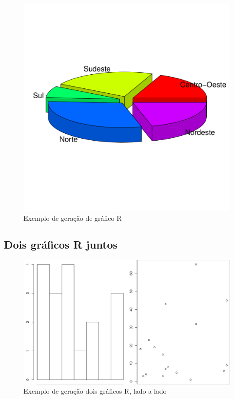 \documentclass[
	12pt,				%
	oneside,			%
	a4paper,			%
	english,			%
	french,				%
	spanish,			%
	brazil				%
	]{abntex2}
\begin{document}
\begin{figure}[htbp]
\hypertarget{pizza}{%
\caption{Exemplo de geração de gráfico R}\label{pizza}
\begin{center}
\includegraphics[scale=0.4]{imagens/R/pizza-grafico.pdf}
\end{center}
}
\end{figure}

\hypertarget{dois-gruxe1ficos-r-juntos}{%
\subsection{Dois gráficos R juntos}\label{dois-gruxe1ficos-r-juntos}}

\begin{figure}[htbp]
\hypertarget{doisgraficos}{%
\caption{Exemplo de geração dois gráficos R, lado a lado}\label{doisgraficos}
\begin{center}
\includegraphics[scale=0.4]{imagens/R/dois-graficos.pdf}
\end{center}
}
\end{figure}
\end{document}
